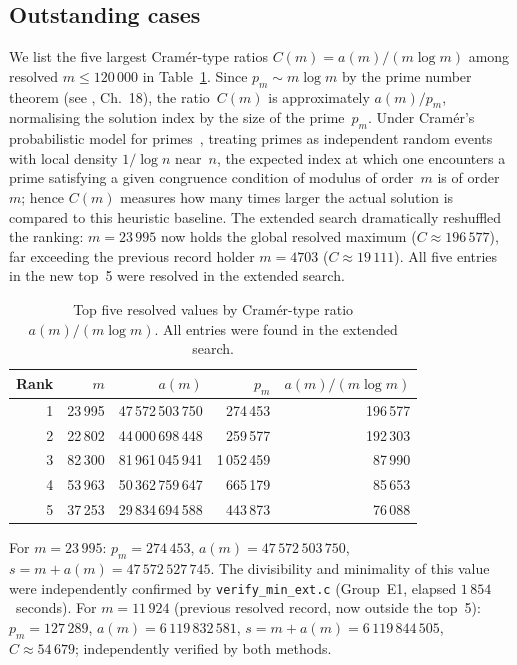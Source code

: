 \documentclass[pdflatex,sn-mathphys-num,Numbered]{sn-jnl}
\theoremstyle{thmstyleone}
\theoremstyle{thmstylethree}
\theoremstyle{thmstyletwo}
\numberwithin{equation}{section}
\begin{document}
\subsection{Outstanding cases}
\label{sec:outstanding}

We list the five largest Cram\'er-type ratios
$C(m) = a(m)/(m\log m)$ among resolved $m \leq 120\,000$
in Table~\ref{tab:ratio}.
Since $p_m \sim m\log m$ by the prime number theorem
(see \cite{Davenport}, Ch.~18), the ratio~$C(m)$
is approximately $a(m)/p_m$,
normalising the solution index by the size of the prime~$p_m$.
Under Cram\'er's probabilistic model for
primes~\cite{Cramer1936}, treating primes as independent random
events with local density $1/\log n$ near~$n$, the expected index
at which one encounters a prime satisfying a given congruence
condition of modulus of order~$m$ is of order~$m$; hence $C(m)$
measures how many times larger the actual solution is compared to
this heuristic baseline.
The extended search dramatically reshuffled the ranking:
$m = 23\,995$ now holds the global resolved maximum
($C \approx 196\,577$), far exceeding the previous record holder
$m = 4703$ ($C \approx 19\,111$).
All five entries in the new top~5 were resolved in the extended search.

\begin{table}[ht]
	\centering
	\caption{Top five resolved values by Cram\'er-type ratio
		$a(m)/(m\log m)$.  All entries were found in the extended search.}
	\label{tab:ratio}
	\begin{tabular}{rrrrr}
		\toprule
		Rank & $m$ & $a(m)$ & $p_m$ & $a(m)/(m\log m)$ \\
		\midrule
		1 & 23\,995 & 47\,572\,503\,750 &  274\,453 & 196\,577 \\
		2 & 22\,802 & 44\,000\,698\,448 &  259\,577 & 192\,303 \\
		3 & 82\,300 & 81\,961\,045\,941 & 1\,052\,459 & 87\,990 \\
		4 & 53\,963 & 50\,362\,759\,647 &  665\,179 & 85\,653 \\
		5 & 37\,253 & 29\,834\,694\,588 &  443\,873 & 76\,088 \\
		\bottomrule
	\end{tabular}
\end{table}

For $m = 23\,995$: $p_m = 274\,453$,
$a(m) = 47\,572\,503\,750$,
$s = m + a(m) = 47\,572\,527\,745$.
The divisibility and minimality of this value were independently
confirmed by \texttt{verify\_min\_ext.c} (Group~E1, elapsed
$1\,854$~seconds).
For $m = 11\,924$ (previous resolved record, now outside the top~5):
$p_m = 127\,289$, $a(m) = 6\,119\,832\,581$,
$s = m + a(m) = 6\,119\,844\,505$,
$C \approx 54\,679$; independently verified by both methods.
\end{document}
